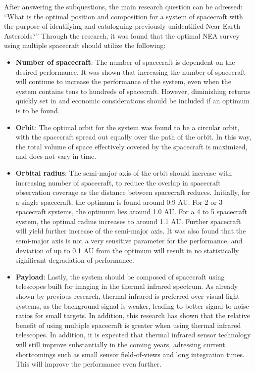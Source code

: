 After answering the subquestions, the main research question can be adressed: ``What is the optimal position and composition for a system of spacecraft with the purpose of identifying and cataloguing previously unidentified Near-Earth Asteroids?'' Through the research, it was found that the optimal NEA survey using multiple spacecraft should utilize the following:
\begin{itemize}
 \item \textbf{Number of spacecraft}: The number of spacecraft is dependent on the desired performance. It was shown that increasing the number of spacecraft will continue to increase the performance of the system, even when the system contains tens to hundreds of spacecraft. However, diminishing returns quickly set in and economic considerations should be included if an optimum is to be found.
 \item \textbf{Orbit}: The optimal orbit for the system was found to be a circular orbit, with the spacecraft spread out equally over the path of the orbit. In this way, the total volume of space effectively covered by the spacecraft is maximized, and does not vary in time.
 \item \textbf{Orbital radius}: The semi-major axis of the orbit should increase with increasing number of spacecraft, to reduce the overlap in spacecraft observation coverage as the distance between spacecraft reduces. Initially, for a single spacecraft, the optimum is found around 0.9 AU. For 2 or 3 spacecraft systems, the optimum lies around 1.0 AU. For a 4 to 5 spacecraft system, the optimal radius increases to around 1.1 AU. Further spacecraft will yield further increase of the semi-major axis. It was also found that the semi-major axis is not a very sensitive parameter for the performance, and deviation of up to 0.1 AU from the optimum will result in no statistically significant degradation of performance.
 \item \textbf{Payload}: Lastly, the system should be composed of spacecraft using telescopes built for imaging in the thermal infrared spectrum. As already shown by previous research, thermal infrared is preferred over visual light systems, as the background signal is weaker, leading to better signal-to-noise ratios for small targets. In addition, this research has shown that the relative benefit of using multiple spacecraft is greater when using thermal infrared telescopes. In addition, it is expected that thermal infrared sensor technology will still improve substantially in the coming years, adressing current shortcomings such as small sensor field-of-views and long integration times. This will improve the performance even further.
\end{itemize}

